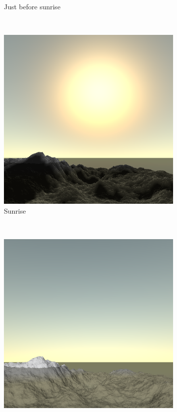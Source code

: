 \documentclass{article}
\begin{document}
\begin{figure}[H]
\begin{subfigure}[b]{0.45\textwidth}
        \caption{Just before sunrise}
        \label{fig:light5}
    \end{subfigure}
    ~
    \begin{subfigure}[b]{0.45\textwidth}
        \centering
        \includegraphics[scale=0.25]{light10}
        \caption{Sunrise}
        \label{fig:light7}
    \end{subfigure}
    ~
    \begin{subfigure}[b]{0.45\textwidth}
        \centering
        \includegraphics[scale=0.25]{light17}

\end{subfigure}
\end{figure}
\end{document}
